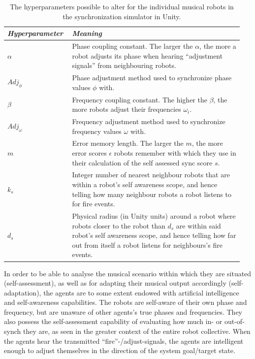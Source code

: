 	\begin{table}[ht]
		\centering
		\begin{tabular}{p{0.25\linewidth} | p{0.7\linewidth}}
		  \textit{\textbf{Hyperparameter}}  & \textit{\textbf{Meaning}} \\ \hline
		  $\alpha$ & Phase coupling constant. The larger the $\alpha$, the more a robot adjusts its phase when hearing ``adjustment signals'' from neighbouring robots. \\ \hline
		  $Adj_\phi$ & Phase adjustment method used to synchronize phase values $\phi$ with. \\ \hline
		  $\beta$ & Frequency coupling constant. The higher the $\beta$, the more robots adjust their frequencies $\omega_i$. \\ \hline
		  $Adj_\omega$ & Frequency adjustment method used to synchronize frequency values $\omega$ with. \\ \hline
		  $m$ & Error memory length. The larger the $m$, the more error scores $\epsilon$ robots remember with which they use in their calculation of the self assessed sync score $s$. \\ \hline
		  $k_s$ & Integer number of nearest neighbour robots that are within a robot's self awareness scope, and hence telling how many neighbour robots a robot listens to for fire events. \\ \hline
		  $d_s$ & Physical radius (in Unity units) around a robot where robots closer to the robot than $d_s$ are within said robot's self awareness scope, and hence telling how far out from itself a robot listens for neighbours's fire events.
		\end{tabular}
		\caption{The hyperparameters possible to alter for the individual musical robots in the synchronization simulator in Unity.}
		\label{tab:synchrony_robot_hyperparameters}
	\end{table}
	
	In order to be able to analyse the musical scenario within which they are situated (self-assessment), as well as for adapting their musical output accordingly (self-adaptation), the agents are to some extent endowed with artificial intelligence and self-awareness capabilities. The robots are self-aware of their own phase and frequency, but are unaware of other agents's true phases and frequencies. They also possess the self-assessment capability of evaluating how much in- or out-of-synch they are, as seen in the greater context of the entire robot collective. When the agents hear the transmitted ``fire''-/adjust-signals, the agents are intelligent enough to adjust themselves in the direction of the system goal/target state.


